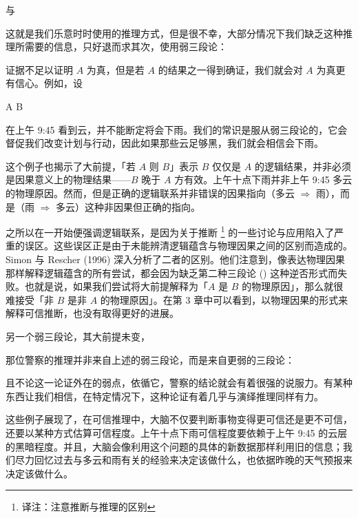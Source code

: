 与

\placeformula[syllogism-2]
\startformula
{}
\stopformula

这就是我们乐意时时使用的推理方式，但是很不幸，大部分情况下我们缺乏这种推理所需要的信息，只好退而求其次，使用弱三段论：

\placeformula[weak-1]
\startformula
{}
\stopformula

证据不足以证明 $A$ 为真，但是若 $A$ 的结果之一得到确证，我们就会对 $A$ 为真更有信心。例如，设

\startformula
\startalign
\NC A\equiv\NC{}\NR
\NC B\equiv\NC{}\NR
\stopalign
\stopformula

在上午 9:45 看到云，并不能断定将会下雨。我们的常识是服从弱三段论的，它会督促我们改变计划与行动，因此如果那些云足够黑，我们就会相信会下雨。

这个例子也揭示了大前提，「若 $A$ 则 $B$」表示 $B$ 仅仅是 $A$ 的逻辑结果，并非必须是因果意义上的物理结果——$B$ 晚于 $A$ 方有效。上午十点下雨并非上午 9:45 多云的物理原因。然而，但是正确的逻辑联系并非错误的因果指向（多云 $\Rightarrow$ 雨），而是（雨 $\Rightarrow$ 多云）这种非因果但正确的指向。

之所以在一开始便强调逻辑联系，是因为关于推断 \footnote{译注：注意推断与推理的区别} 的一些讨论与应用陷入了严重的误区。这些误区正是由于未能辨清逻辑蕴含与物理因果之间的区别而造成的。Simon 与 Rescher (1996) 深入分析了二者的区别。他们注意到，像表达物理因果那样解释逻辑蕴含的所有尝试，都会因为缺乏第二种三段论 (\in[syllogism-2]) 这种逆否形式而失败。也就是说，如果我们尝试将大前提解释为「$A$ 是 $B$ 的物理原因」，那么就很难接受「非 $B$ 是非 $A$ 的物理原因」。在第 3 章中可以看到，以物理因果的形式来解释可信推断，也没有取得更好的进展。

另一个弱三段论，其大前提未变，

\placeformula[weak-2]
\startformula
{}
\stopformula

那位警察的推理并非来自上述的弱三段论，而是来自更弱的三段论：

\placeformula[weak-3]
\startformula
{}
\stopformula

且不论这一论证外在的弱点，依循它，警察的结论就会有着很强的说服力。有某种东西让我们相信，在特定情况下，这种论证有着几乎与演绎推理同样有力。

这些例子展现了，在可信推理中，大脑不仅要判断事物变得更可信还是更不可信，还要以某种方式估算可信程度。上午十点下雨可信程度要依赖于上午 9:45 的云层的黑暗程度。并且，大脑会像利用这个问题的具体的新数据那样利用旧的信息；我们尽力回忆过去与多云和雨有关的经验来决定该做什么，也依据昨晚的天气预报来决定该做什么。

